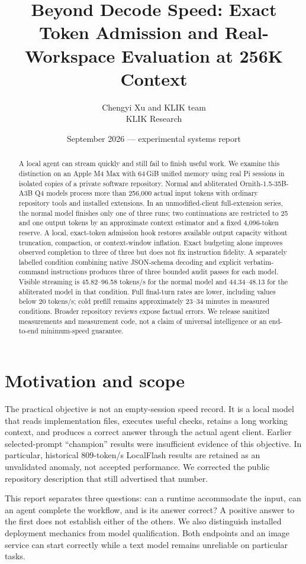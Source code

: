 \documentclass[11pt]{article}
\title{\textbf{Beyond Decode Speed: Exact Token Admission and Real-Workspace Evaluation at 256K Context}}
\author{Chengyi Xu and KLIK team\\\small KLIK Research}
\date{September 2026 --- experimental systems report}
\begin{document}
\maketitle
\begin{abstract}
A local agent can stream quickly and still fail to finish useful work. We examine this distinction on an Apple M4 Max with 64\,GiB unified memory using real Pi sessions in isolated copies of a private software repository. Normal and abliterated Ornith-1.5-35B-A3B Q4 models process more than 256,000 actual input tokens with ordinary repository tools and installed extensions. In an unmodified-client full-extension series, the normal model finishes only one of three runs; two continuations are restricted to 25 and one output tokens by an approximate context estimator and a fixed 4,096-token reserve. A local, exact-token admission hook restores available output capacity without truncation, compaction, or context-window inflation. Exact budgeting alone improves observed completion to three of three but does not fix instruction fidelity. A separately labelled condition combining native JSON-schema decoding and explicit verbatim-command instructions produces three of three bounded audit passes for each model. Visible streaming is 45.82--96.58 tokens/s for the normal model and 44.34--48.13 for the abliterated model in that condition. Full final-turn rates are lower, including values below 20 tokens/s; cold prefill remains approximately 23--34 minutes in measured conditions. Broader repository reviews expose factual errors. We release sanitized measurements and measurement code, not a claim of universal intelligence or an end-to-end minimum-speed guarantee.
\end{abstract}

\section{Motivation and scope}
The practical objective is not an empty-session speed record. It is a local model that reads implementation files, executes useful checks, retains a long working context, and produces a correct answer through the actual agent client. Earlier selected-prompt ``champion'' results were insufficient evidence of this objective. In particular, historical 809-token/s LocalFlash results are retained as an unvalidated anomaly, not accepted performance. We corrected the public repository description that still advertised that number.

This report separates three questions: can a runtime accommodate the input, can an agent complete the workflow, and is its answer correct? A positive answer to the first does not establish either of the others. We also distinguish installed deployment mechanics from model qualification. Both endpoints and an image service can start correctly while a text model remains unreliable on particular tasks.
\end{document}
